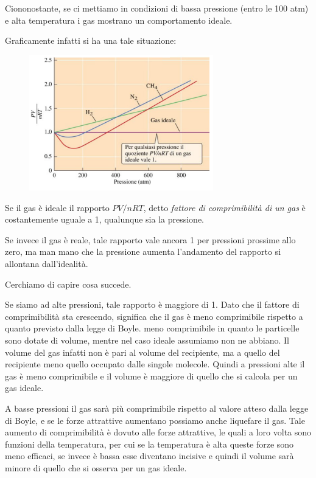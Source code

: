 Ciononostante, se ci mettiamo in condizioni di bassa pressione (entro le 100 atm) e alta temperatura i gas mostrano un comportamento ideale.

Graficamente infatti si ha una tale situazione:

\begin{minipage}{0.55 \textwidth}
    \begin{figure}[H]
        \includegraphics[width=8cm]{immagini/grafico_gas_reali.png}
    \end{figure}
\end{minipage}
\begin{minipage}{0.44 \textwidth}
\vspace{-0.4cm}Se il gas è ideale il rapporto $PV/nRT$, detto \textit{fattore di comprimibilità di un gas} è costantemente uguale a 1, qualunque sia la pressione. 

\vspace{0.2cm}Se invece il gas è reale, tale rapporto vale ancora 1 per pressioni prossime allo zero, ma man mano che la pressione aumenta l'andamento del rapporto si allontana dall'idealità.
\end{minipage}

Cerchiamo di capire cosa succede.

Se siamo ad alte pressioni, tale rapporto è maggiore di 1. Dato che il fattore di comprimibilità sta crescendo, significa che il gas è meno comprimibile rispetto a quanto previsto dalla legge di Boyle. \E meno comprimibile in quanto le particelle sono dotate di volume, mentre nel caso ideale assumiamo non ne abbiano. Il volume del gas infatti non è pari al volume del recipiente, ma a quello del recipiente meno quello occupato dalle singole molecole. Quindi a pressioni alte il gas è meno comprimibile e il volume è maggiore di quello che si calcola per un gas ideale.

A basse pressioni il gas sarà più comprimibile rispetto al valore atteso dalla legge di Boyle, e se le forze attrattive aumentano possiamo anche liquefare il gas. Tale aumento di comprimibilità è dovuto alle forze attrattive, le quali a loro volta sono funzioni della temperatura, per cui se la temperatura è alta queste forze sono meno efficaci, se invece è bassa esse diventano incisive e quindi il volume sarà minore di quello che si osserva per un gas ideale.

